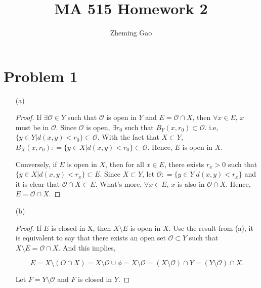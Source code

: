 \documentclass[12pt]{article}
\begin{document}
 
 
\title{MA 515 Homework 2}
\author{Zheming Gao}
\maketitle

\section*{Problem 1}

\begin{enumerate}
\item [(a)]

\begin{proof}

If $\exists \mathcal{O} \in Y$ such that $\mathcal{O}$ is open in $Y$ and $E = \mathcal{O} \cap X$, then $\forall x \in E$, $x$ must be in $\mathcal{O}$. Since $\mathcal{O}$ is open, $\exists r_0$ such that $B_Y(x, r_0) \subset \mathcal{O}$. i.e, $\{y\in Y | d(x, y) < r_0\} \subset \mathcal{O}$. With the fact that $X\subset Y$, $B_X(x, r_0) : = \{ y\in X | d(x, y) < r_0 \} \subset \mathcal{O}$. Hence, $E$ is open in $X$.

Conversely, if $E$ is open in $X$, then for all $x\in E$, there exists $r_x >0$ such that $\{ y\in X | d(x, y) < r_x \} \subset E$. Since $X \subset Y$, let $\mathcal{O}: = \{ y\in Y | d(x, y) < r_x \}$ and it is clear that $\mathcal{O}\cap X \subset E$. What's more, $\forall x \in E$, $x$ is also in $\mathcal{O}\cap X$. Hence, $E = \mathcal{O}\cap X$.

\end{proof}

\item [(b)]

\begin{proof}

If $E$ is closed in X, then $X \setminus E$ is open in $X$. Use the result from (a), it is equivalent to say that there exists an open set $\mathcal{O} \subset Y$ such that $X\setminus E = \mathcal{O} \cap X$. And this implies,

$$
E = X\setminus (O\cap X) = X \setminus \mathcal{O} \cup \phi = X \setminus \mathcal{O} = ( X \setminus \mathcal{O}) \cap Y = (Y\setminus \mathcal{O}) \cap X.
$$

Let $F = Y\setminus \mathcal{O}$ and $F$ is closed in $Y$.

\end{proof}

\end{enumerate}
\end{document}
